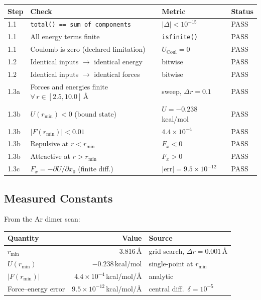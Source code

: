 \documentclass[11pt]{article}
\begin{document}
\begin{center}
\begin{tabular}{llll}
\toprule
Step & Check & Metric & Status \\
\midrule
1.1 & \texttt{total() == sum of components}
    & $|\Delta| < 10^{-15}$ & PASS \\
1.1 & All energy terms finite
    & \texttt{isfinite()} & PASS \\
1.1 & Coulomb is zero (declared limitation)
    & $U_{\mathrm{Coul}} = 0$ & PASS \\
\midrule
1.2 & Identical inputs $\to$ identical energy
    & bitwise & PASS \\
1.2 & Identical inputs $\to$ identical forces
    & bitwise & PASS \\
\midrule
1.3a & Forces and energies finite $\forall\, r \in [2.5, 10.0]$\,\AA
    & sweep, $\Delta r = 0.1$ & PASS \\
1.3b & $U(r_{\min}) < 0$ (bound state)
    & $U = -0.238$\,kcal/mol & PASS \\
1.3b & $|F(r_{\min})| < 0.01$
    & $4.4 \times 10^{-4}$ & PASS \\
1.3b & Repulsive at $r < r_{\min}$
    & $F_x < 0$ & PASS \\
1.3b & Attractive at $r > r_{\min}$
    & $F_x > 0$ & PASS \\
1.3c & $F_x = -\partial U/\partial x_0$ (finite diff.)
    & $|\mathrm{err}| = 9.5 \times 10^{-12}$ & PASS \\
\bottomrule
\end{tabular}
\end{center}

\subsection{Measured Constants}

From the Ar dimer scan:
\begin{center}
\begin{tabular}{lrl}
\toprule
Quantity & Value & Source \\
\midrule
$r_{\min}$ & 3.816\,\AA & grid search, $\Delta r = 0.001$\,\AA \\
$U(r_{\min})$ & $-0.238$\,kcal/mol & single-point at $r_{\min}$ \\
$|F(r_{\min})|$ & $4.4 \times 10^{-4}$\,kcal/mol/\AA & analytic \\
Force--energy error & $9.5 \times 10^{-12}$\,kcal/mol/\AA & central diff.\ $\delta = 10^{-5}$ \\
\bottomrule
\end{tabular}
\end{center}
\end{document}
